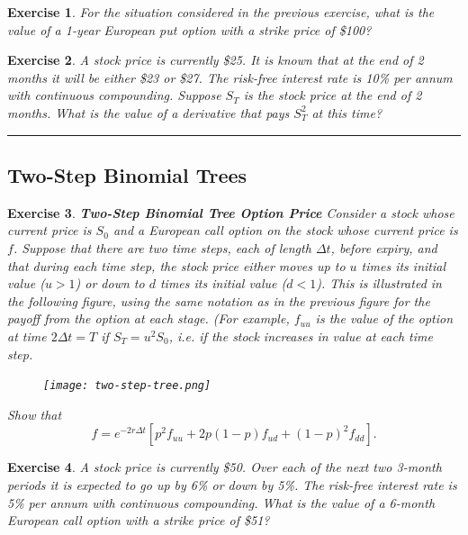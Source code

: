 \documentclass[letterpaper,10pt]{article}
\newtheorem{ex}{Exercise}
\begin{document}
\begin{ex}
For the situation considered in the previous exercise, what is the value of a 1-year European put option with a strike price of \$100? 
\end{ex}



\begin{ex}
A stock price is currently \$25. It is known that at the end of 2 months it will be either \$23 or \$27. The risk-free interest rate is 10\% per annum with continuous compounding. Suppose $S_T$ is the stock price at the end of 2 months. What is the value of a derivative that pays $S_T^2$ at this time?
\end{ex}

\bigskip

\hrule

\bigskip

\subsection{Two-Step Binomial Trees}


\begin{ex}{\bf Two-Step Binomial Tree Option Price}
Consider a stock whose current price is $S_0$ and a European call option on the stock whose current price is $f$.  Suppose that there are two time steps, each of length $\Delta t$, before expiry, and that during each time step, the stock price either moves up to $u$ times its initial value ($u>1$) or down to $d$ times its initial value ($d<1$).  This is illustrated in the following figure, using the same notation as in the previous figure for the payoff from the option at each stage.  (For example, $f_{uu}$ is the value of the option at time $2\Delta t=T$ if $S_T=u^2S_0$, i.e. if the stock increases in value at each time step.

\begin{center}
\begin{figure}[H]
\texttt{[image: two-step-tree.png]}
\end{figure}
\end{center}

Show that $$f=e^{-2r\Delta t}\left[p^2f_{uu}+2p(1-p)f_{ud}+(1-p)^2f_{dd}\right].$$

\end{ex}


\begin{ex}
A stock price is currently \$50. Over each of the next two 3-month periods it is expected to go up by 6\% or down by 5\%. The risk-free interest rate is 5\% per annum with continuous compounding. What is the value of a 6-month European call option with a strike price of \$51?
\end{ex}
\end{document}

